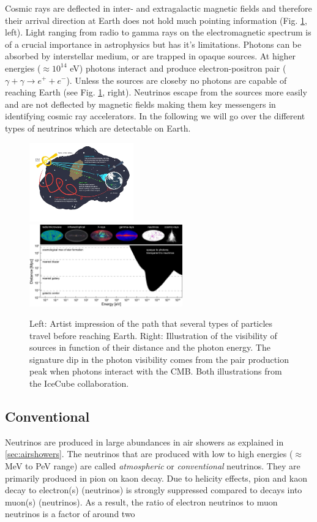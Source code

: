 Cosmic rays are deflected in inter- and extragalactic magnetic fields and therefore their arrival direction at Earth does not hold much pointing information (Fig. \ref{fig:sourceinfo}, left). Light ranging from radio to gamma rays on the electromagnetic spectrum is of a crucial importance in astrophysics but has it's limitations. Photons can be absorbed by interstellar medium, or are trapped in opaque sources. At higher energies ($\approx 10^{14}$ eV) photons interact and produce electron-positron pair ($\gamma + \gamma \rightarrow e^+ + e^-$). Unless the sources are closeby no photons are capable of reaching Earth (see Fig. \ref{fig:sourceinfo}, right). Neutrinos escape from the sources more easily and are not deflected by magnetic fields making them key messengers in identifying cosmic ray accelerators. In the following we will go over the different types of neutrinos which are detectable on Earth.

\begin{figure}[t]
\label{fig:sourceinfo}
\centering
\includegraphics[width=0.4\textwidth]{chapter3/img/sourceinformation_3.jpg}
\includegraphics[width=0.59\textwidth]{chapter3/img/opaque-to-photons.png}
\caption{Left: Artist impression of the path that several types of particles travel before reaching Earth. Right: Illustration of the visibility of sources in function of their distance and the photon energy. The signature dip in the photon visibility comes from the pair production peak when photons interact with the CMB. Both illustrations from the IceCube collaboration.}
\end{figure}


\subsection{Conventional}
Neutrinos are produced in large abundances in air showers as explained in \ref{sec:airshowers}. The neutrinos that are produced with low to high energies ($\approx$ MeV to PeV range) are called \textit{atmospheric} or \textit{conventional} neutrinos. They are primarily produced in pion on kaon decay. Due to helicity effects, pion and kaon decay to electron(s) (neutrinos) is strongly suppressed compared to decays into muon(s) (neutrinos). As a result, the ratio of electron neutrinos to muon neutrinos is a factor of around two

